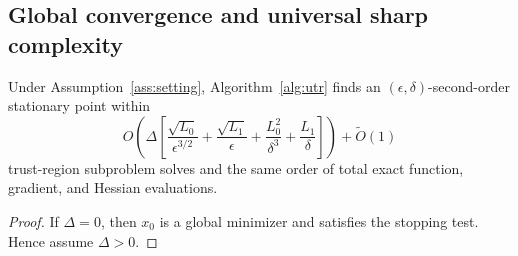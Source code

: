 \subsection{Global convergence and universal sharp complexity}
\label{sec:main-theorem}

\begin{theorem}\label{thm:main}
Under Assumption~\ref{ass:setting}, Algorithm~\ref{alg:utr} finds an
$(\epsilon,\delta)$-second-order stationary point within
\begin{equation}\label{eq:complexity}
 O\!\left(\Delta\left[
 \frac{\sqrt{L_0}}{\epsilon^{3/2}}+
 \frac{\sqrt{L_1}}{\epsilon}+
 \frac{L_0^2}{\delta^3}+
 \frac{L_1}{\delta}\right]\right)+\widetilde O(1)
\end{equation}
trust-region subproblem solves and the same order of total exact
function, gradient, and Hessian evaluations.
\end{theorem}
\begin{proof}
If $\Delta=0$, then $x_0$ is a global minimizer and satisfies the stopping
test. Hence assume $\Delta>0$.

\end{proof}
